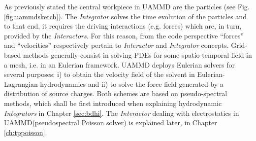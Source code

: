 \documentclass[ twoside,openright,titlepage,numbers=noenddot,%
headinclude,footinclude,cleardoublepage=empty,abstract=on,
BCOR=5mm,paper=b5,fontsize=11pt, dvipsnames
]{scrreprt}
\newcommand{\uammd}{\gls{UAMMD}\xspace}
\begin{document}
As previously stated the central workpiece in \uammd are the particles (see Fig. \ref{fig:uammdsketch}). The \emph{Integrator} solves the time evolution of the particles and to that end, it requires the driving interactions (e.g. forces) which are, in turn, provided by the \emph{Interactors}. For this reason, from the code perspective ``forces'' and ``velocities'' respectively pertain to \emph{Interactor} and \emph{Integrator} concepts. Grid-based methods generally consist in solving \glspl{PDE} for some spatio-temporal field in a mesh, i.e. in an Eulerian framework. \uammd deploys Eulerian solvers for several purposes: i) to obtain the velocity field of the solvent in Eulerian-Lagrangian hydrodynamics and ii) to solve the force field generated by a distribution of source charges. Both schemes are based on pseudo-spectral methods, which shall be first introduced when explaining hydrodynamic \emph{Integrators} in Chapter \ref{sec:bdhi}. The \emph{Interactor} dealing with electrostatics in \uammd (pseudospectral Poisson solver) is explained later, in Chapter \ref{ch:tppoisson}.
\end{document}
